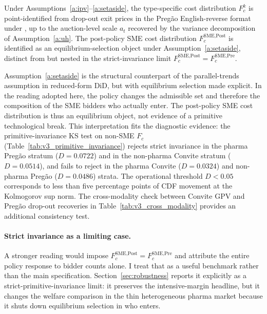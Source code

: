 \begin{proposition}\label{prop:identification}
Under Assumptions~\ref{a:ipv}--\ref{a:setaside}, the type-specific cost distribution $F_c^k$ is point-identified from drop-out exit prices in the Preg\~ao English-reverse format under \citet{haile2003}, up to the auction-level scale $a_t$ recovered by the \citet{krasnokutskaya2011} variance decomposition of Assumption~\ref{a:uh}. The post-policy SME cost distribution $F_c^{\text{SME,Post}}$ is identified as an equilibrium-selection object under Assumption~\ref{a:setaside}, distinct from but nested in the strict-invariance limit $F_c^{\text{SME,Post}} = F_c^{\text{SME,Pre}}$.
\end{proposition}

Assumption~\ref{a:setaside} is the structural counterpart of the parallel-trends assumption in reduced-form DiD, but with equilibrium selection made explicit. In the \citet{atheyseira2011} reading adopted here, the policy changes the admissible set and therefore the composition of the SME bidders who actually enter. The post-policy SME cost distribution is thus an equilibrium object, not evidence of a primitive technological break. This interpretation fits the diagnostic evidence: the primitive-invariance KS test on non-SME $F_c$ (Table~\ref{tab:v3_primitive_invariance}) rejects strict invariance in the pharma Preg\~ao stratum ($D = 0.0722$) and in the non-pharma Convite stratum ($D = 0.0514$), and fails to reject in the pharma Convite ($D = 0.0324$) and non-pharma Preg\~ao ($D = 0.0486$) strata. The operational threshold $D < 0.05$ corresponds to less than five percentage points of CDF movement at the Kolmogorov sup norm. The cross-modality check between Convite GPV and Preg\~ao drop-out recoveries in Table~\ref{tab:v3_cross_modality} provides an additional consistency test.

\paragraph{Strict invariance as a limiting case.} A stronger reading would impose $F_c^{\text{SME,Post}} = F_c^{\text{SME,Pre}}$ and attribute the entire policy response to bidder counts alone. I treat that as a useful benchmark rather than the main specification. Section~\ref{sec:robustness} reports it explicitly as a strict-primitive-invariance limit: it preserves the intensive-margin headline, but it changes the welfare comparison in the thin heterogeneous pharma market because it shuts down equilibrium selection in who enters.

